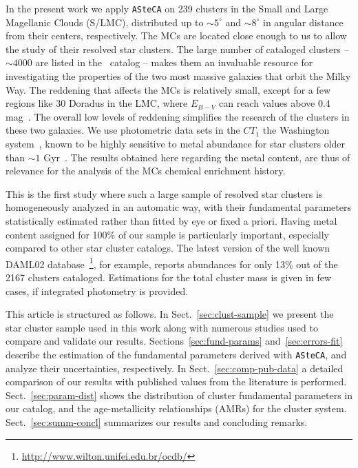 \documentclass{aa}
\begin{document}
In the present work we apply \texttt{ASteCA} on 239 clusters in the Small and
Large Magellanic Clouds (S/LMC), distributed up to ${\sim}5^{\circ}$ and $
{\sim}8^{\circ}$ in angular distance from their centers, respectively.
%
The MCs are located close enough to us to allow the study of their resolved star
clusters. The large number of cataloged clusters -- $\sim4000$ are listed in
the~\cite{Bica_2008} catalog -- makes them an invaluable resource for
investigating the properties of the two most massive galaxies that orbit the
Milky Way.
%
The reddening that affects the MCs is relatively small, except for a few regions
like 30 Doradus in the LMC, where $E_{B-V}$ can reach values above $0.4$
mag~\citep{Piatti_2015b}. The overall low levels of reddening simplifies
the research of the clusters in these two galaxies.
%
We use photometric data sets in the $CT_1$ the Washington
system~\citep{Canterna_1976,Geisler_1996}, known to be highly sensitive
to metal abundance for star clusters older than ${\sim}1$
Gyr~\citep{Geisler_1999}.
The results obtained here regarding the metal content, are thus of relevance for
the analysis of the MCs chemical enrichment history.

This is the first study where such a large sample of resolved star clusters is
homogeneously analyzed in an automatic way, with their fundamental
parameters statistically estimated rather than fitted by eye or fixed a priori.
%
Having metal content assigned for 100\% of our sample is particularly
important, especially compared to other star cluster catalogs. The latest
version of the well known DAML02 database~\citep[v3.5, 2016 Jan 28;][]
{Dias_2002}\footnote{\url{http://www.wilton.unifei.edu.br/ocdb/}},
for example, reports abundances for only 13\% out of the 2167
clusters cataloged. Estimations for the total cluster mass is given in few
cases, if integrated photometry is provided.

This article is structured as follows.
In Sect.~\ref{sec:clust-sample} we present the star cluster sample used in
this work along with numerous studies used to compare and validate our
results.
Sections~\ref{sec:fund-params} and~\ref{sec:errors-fit} describe the estimation
of the fundamental parameters derived with \texttt{ASteCA}, and analyze their
uncertainties, respectively.
In Sect.~\ref{sec:comp-pub-data} a detailed comparison of our results with
published values from the literature is performed.
Sect.~\ref{sec:param-dist} shows the distribution of cluster fundamental
parameters in our catalog, and the age-metallicity relationships (AMRs) for the
cluster system.
Sect.~\ref{sec:summ-concl} summarizes our results and concluding remarks.
\end{document}
